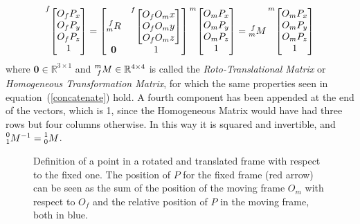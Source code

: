 \documentclass[a4paper,12pt,oneside]{report}
\begin{document}
\begin{equation}
  \prescript{f}{}{\begin{bmatrix}
    O_fP_x\\
    O_fP_y\\
    O_fP_z\\
    1
  \end{bmatrix}}=\begin{bmatrix}
    \prescript{f}{m}{R}&\prescript{f}{}{\begin{bmatrix}
      O_fO_mx\\
      O_fO_my\\
      O_fO_mz\\
    \end{bmatrix}}\\
    \mathbf{0}&1
  \end{bmatrix}\prescript{m}{}{\begin{bmatrix}
      O_mP_x\\
      O_mP_y\\
      O_mP_z\\
      1
    \end{bmatrix}}=\prescript{f}{m}{M}\prescript{m}{}{\begin{bmatrix}
      O_mP_x\\
      O_mP_y\\
      O_mP_z\\
      1
    \end{bmatrix}}
\label{roto_translation}
\end{equation}
where $\mathbf{0} \in \mathbb{R}^{3\times1}$ and $\prescript{m}{f}{M} \in \mathbb{R}^{4\times4}$ is called the \textit{Roto-Translational Matrix} or \textit{Homogeneous Transformation Matrix}, for which the same properties seen in equation~(\ref{concatenate}) hold. A fourth component has been appended at the end of the vectors, which is 1, since the Homogeneous Matrix would have had three rows but four columns otherwise. In this way it is squared and invertible, and $\prescript{0}{1}{M}^{-1}=\prescript{1}{0}{M}$.
\begin{figure}[h]
  \centering
  
  \caption{Definition of a point in a rotated and translated frame with respect to the fixed one. The position of $P$ for the fixed frame (red arrow) can be seen as the sum of the position of the moving frame $O_m$ with respect to $O_f$ and the relative position of $P$ in the moving frame, both in blue.}
  \label{translation}
\end{figure}
\newpage
\end{document}
